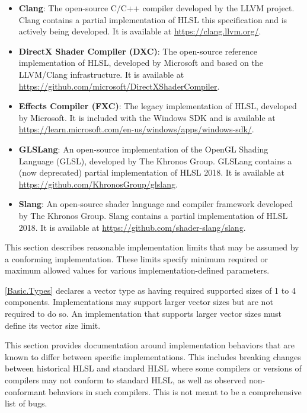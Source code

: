 \begin{itemize}
  \item \textbf{Clang}: The open-source C/C++ compiler developed by the LLVM
    project. Clang contains a partial implementation of HLSL this specification
    and is actively being developed. It is available at
    \url{https://clang.llvm.org/}.
  \item \textbf{DirectX Shader Compiler (DXC)}: The open-source reference
    implementation of HLSL, developed by Microsoft and based on the LLVM/Clang
    infrastructure. It is available at
    \url{https://github.com/microsoft/DirectXShaderCompiler}.
  \item \textbf{Effects Compiler (FXC)}: The legacy implementation of HLSL,
    developed by Microsoft. It is included with the Windows SDK and is available
    at \url{https://learn.microsoft.com/en-us/windows/apps/windows-sdk/}.
  \item \textbf{GLSLang}: An open-source implementation of the OpenGL Shading
    Language (GLSL), developed by The Khronos Group. GLSLang contains a (now
    deprecated) partial implementation of HLSL 2018. It is available at
    \url{https://github.com/KhronosGroup/glslang}.
  \item \textbf{Slang}: An open-source shader language and compiler framework
    developed by The Khronos Group. Slang contains a partial implementation of
    HLSL 2018. It is available at \url{https://github.com/shader-slang/slang}.
\end{itemize}


\p This section describes reasonable implementation limits that may be assumed
by a conforming implementation. These limits specify minimum required or maximum
allowed values for various implementation-defined parameters.

\p \ref{Basic.Types} declares a vector type as having required supported sizes
of 1 to 4 components. Implementations may support larger vector sizes but are
not required to do so. An implementation that supports larger vector sizes must
define its vector size limit.


\p This section provides documentation around implementation behaviors that are
known to differ between specific implementations. This includes breaking
changes between historical HLSL and standard HLSL where some compilers or
versions of compilers may not conform to standard HLSL, as well as observed
non-conformant behaviors in such compilers. This is not meant to be a
comprehensive list of bugs.

